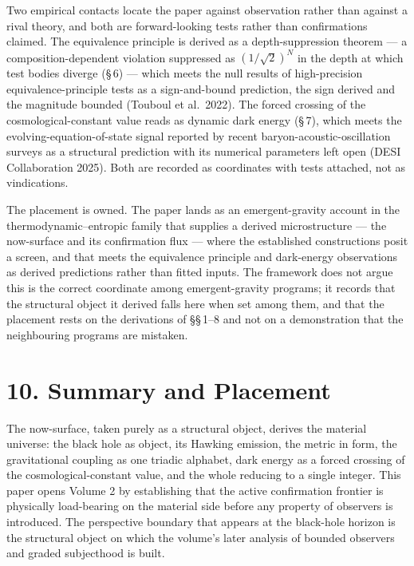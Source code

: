 \documentclass[11pt,oneside]{report}
\theoremstyle{definition}
\theoremstyle{remark}
\begin{document}
Two empirical contacts locate the paper against observation rather than against a rival theory, and both are forward-looking tests rather than confirmations claimed. The equivalence principle is derived as a depth-suppression theorem --- a composition-dependent violation suppressed as $(1/\sqrt{2})^N$ in the depth at which test bodies diverge (\S\,6) --- which meets the null results of high-precision equivalence-principle tests as a sign-and-bound prediction, the sign derived and the magnitude bounded (Touboul et al.\ 2022). The forced crossing of the cosmological-constant value reads as dynamic dark energy (\S\,7), which meets the evolving-equation-of-state signal reported by recent baryon-acoustic-oscillation surveys as a structural prediction with its numerical parameters left open (DESI Collaboration 2025). Both are recorded as coordinates with tests attached, not as vindications.

The placement is owned. The paper lands as an emergent-gravity account in the thermodynamic--entropic family that supplies a derived microstructure --- the now-surface and its confirmation flux --- where the established constructions posit a screen, and that meets the equivalence principle and dark-energy observations as derived predictions rather than fitted inputs. The framework does not argue this is the correct coordinate among emergent-gravity programs; it records that the structural object it derived falls here when set among them, and that the placement rests on the derivations of \S\S\,1--8 and not on a demonstration that the neighbouring programs are mistaken.



\section*{10. Summary and Placement}

The now-surface, taken purely as a structural object, derives the
material universe: the black hole as object, its Hawking emission, the
metric in form, the gravitational coupling as one triadic alphabet, dark
energy as a forced crossing of the cosmological-constant value, and the
whole reducing to a single integer. This paper opens Volume 2 by
establishing that the active confirmation frontier is physically
load-bearing on the material side before any property of observers is
introduced. The perspective boundary that appears at the black-hole
horizon is the structural object on which the volume's later analysis of
bounded observers and graded subjecthood is built.
\end{document}
